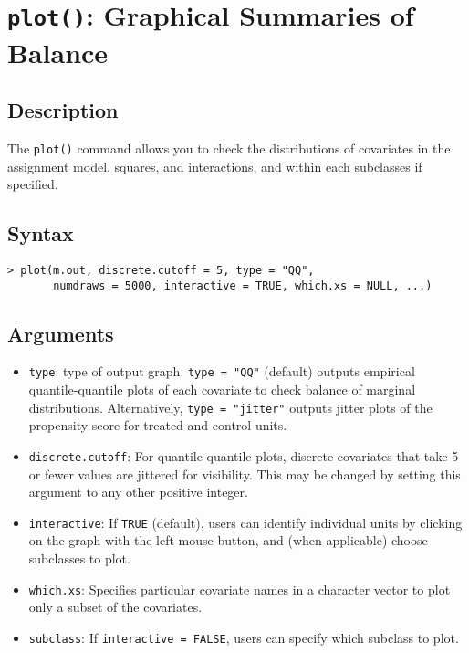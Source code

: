 \section{\texttt{plot()}: Graphical Summaries of Balance}

\subsection{Description}
The \texttt{plot()} command allows you to check the distributions of
covariates in the assignment model, squares, and interactions, and
within each subclasses if specified.  

\subsection{Syntax}

\begin{verbatim}
> plot(m.out, discrete.cutoff = 5, type = "QQ", 
       numdraws = 5000, interactive = TRUE, which.xs = NULL, ...)
\end{verbatim}

\subsection{Arguments}

\begin{itemize}
\item {\tt type}: type of output graph. \texttt{type = "QQ"}
  (default) outputs empirical quantile-quantile plots of each
  covariate to check balance of marginal distributions. Alternatively,
  \texttt{type = "jitter"} outputs jitter plots of the propensity
  score for treated and control units.
  
\item {\tt discrete.cutoff}: For quantile-quantile plots, discrete
  covariates that take 5 or fewer values are jittered for visibility.
  This may be changed by setting this argument to any other positive
  integer.
  
\item {\tt interactive}: If \texttt{TRUE} (default), users can
  identify individual units by clicking on the graph with the left
  mouse button, and (when applicable) choose subclasses to plot.
  
\item {\tt which.xs}: Specifies particular covariate names in a
  character vector to plot only a subset of the covariates.

\item {\tt subclass}: If \texttt{interactive = FALSE}, users can
  specify which subclass to plot. 

\end{itemize}

